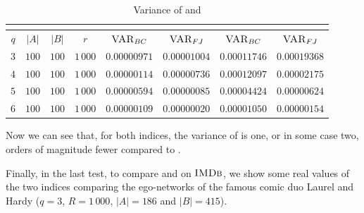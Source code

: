 \begin{table}[h]
	\centering
	\begin{tabular}{|c|c|c|c|c|c|c|c|}
		\cline{5-8}
		\multicolumn{4}{c|}{} & \multicolumn{2}{c|}{\fsamp} & \multicolumn{2}{c|}{\base}\\
		\hline
		$q$ & $|A|$ & $|B|$ & $r$      & $\textsc{VAR}_{BC}$ & $\textsc{VAR}_{FJ}$ & $\textsc{VAR}_{BC}$ & $\textsc{VAR}_{FJ}$ \\ \hline 
		$3$ & $100$ & $100$ & $1\,000$ & $0.00000971$        & $0.00001004$        & $0.00011746$        & $0.00019368$        \\ \hline
		$4$ & $100$ & $100$ & $1\,000$ & $0.00000114$        & $0.00000736$        & $0.00012097$        & $0.00002175$        \\ \hline
		$5$ & $100$ & $100$ & $1\,000$ & $0.00000594$        & $0.00000085$        & $0.00004424$        & $0.00000624$        \\ \hline
		$6$ & $100$ & $100$ & $1\,000$ & $0.00000109$        & $0.00000020$        & $0.00001050$        & $0.00000154$        \\ \hline
	\end{tabular}
	\caption{Variance of \fsamp and \base}	
\end{table}

Now we can see that, for both indices, the variance of \fsamp is one, or in some case two, orders of magnitude fewer compared to \base.

Finally, in the last test, to compare \fsamp and \base on $\textsc{IMDb}$, we show some real values of the two indices comparing the ego-networks of the famous comic duo Laurel and Hardy
($q=3$, $R=1\,000$, $|A| = 186$ and $|B| = 415$).


